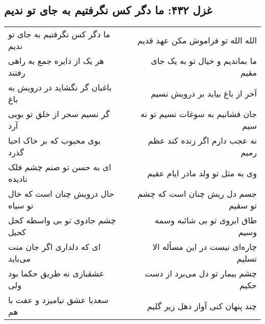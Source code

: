 \begin{center}
\section*{غزل ۴۳۲: ما دگر کس نگرفتیم به جای تو ندیم}
\label{sec:432}
\begin{longtable}{l p{0.5cm} r}
ما دگر کس نگرفتیم به جای تو ندیم
&&
الله الله تو فراموش مکن عهد قدیم
\\
هر یک از دایره جمع به راهی رفتند
&&
ما بماندیم و خیال تو به یک جای مقیم
\\
باغبان گر نگشاید در درویش به باغ
&&
آخر از باغ بیاید بر درویش نسیم
\\
گر نسیم سحر از خلق تو بویی آرد
&&
جان فشانیم به سوغات نسیم تو نه سیم
\\
بوی محبوب که بر خاک احبا گذرد
&&
نه عجب دارم اگر زنده کند عظم رمیم
\\
ای به حسن تو صنم چشم فلک نادیده
&&
وی به مثل تو ولد مادر ایام عقیم
\\
حال درویش چنان است که خال تو سیاه
&&
جسم دل ریش چنان است که چشم تو سقیم
\\
چشم جادوی تو بی واسطه کحل کحیل
&&
طاق ابروی تو بی شائبه وسمه وسیم
\\
ای که دلداری اگر جان منت می‌باید
&&
چاره‌ای نیست در این مسأله الا تسلیم
\\
عشقبازی نه طریق حکما بود ولی
&&
چشم بیمار تو دل می‌برد از دست حکیم
\\
سعدیا عشق نیامیزد و عفت با هم
&&
چند پنهان کنی آواز دهل زیر گلیم
\\
\end{longtable}
\end{center}
